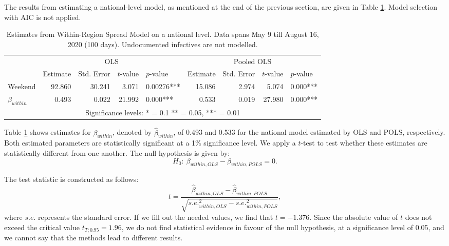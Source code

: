 \documentclass[12pt]{article}
\begin{document}
	The results from estimating a national-level model, as mentioned at the end of the previous section, are given in Table \ref{tab:results_within_national}. Model selection with AIC is not applied.
	
	\begin{table}[H]
	    \centering
	    \caption{Estimates from Within-Region Spread Model on a national level. Data spans May 9 till August 16, 2020 (100 days). Undocumented infectives are not modelled.}
		\label{tab:results_within_national}
	    \begin{tabular}{lrrrlrrrl}
	        \toprule
    		& \multicolumn{4}{c}{OLS} & \multicolumn{4}{c}{Pooled OLS} \\
    		                \cmidrule(lr){2-5}
                            \cmidrule(lr){6-9}
    		& Estimate & Std. Error & $t$-value & $p$-value & Estimate & Std. Error & $t$-value & $p$-value \\* \midrule
    		Weekend             & 92.860 & 30.241 & 3.071 & 0.00276*** & 15.086 & 2.974 & 5.074 & 0.000*** \\*
    		$\beta_{within}$    & 0.493 & 0.022 & 21.992 & 0.000*** & 0.533 & 0.019 & 27.980 & 0.000*** \\* \bottomrule
    		\multicolumn{9}{c}{Significance levels: * = 0.1 ** = 0.05, *** = 0.01}
	    \end{tabular}
	\end{table}
	
	Table \ref{tab:results_within_national} shows estimates for $\beta_{within}$, denoted by $\hat{\beta}_{within}$, of 0.493 and 0.533 for the national model estimated by OLS and POLS, respectively. Both estimated parameters are statistically significant at a 1\% significance level. We apply a $t$-test to test whether these estimates are statistically different from one another. The null hypothesis is given by:
	    \[H_0:~ \beta_{within,OLS} - \beta_{within,POLS} = 0.\]
	
	The test statistic is constructed as follows:
	    \[t = \frac{\hat{\beta}_{within, OLS} - \hat{\beta}_{within, POLS}}{\sqrt{s.e.^2_{within, OLS} - s.e.^2_{within, POLS}}},\]
	where $s.e.$ represents the standard error. If we fill out the needed values, we find that $t = -1.376$. Since the absolute value of $t$ does not exceed the critical value $t_{T; 0.95} = 1.96$, we do not find statistical evidence in favour of the null hypothesis, at a significance level of 0.05, and we cannot say that the methods lead to different results. \\
	
\end{document}
